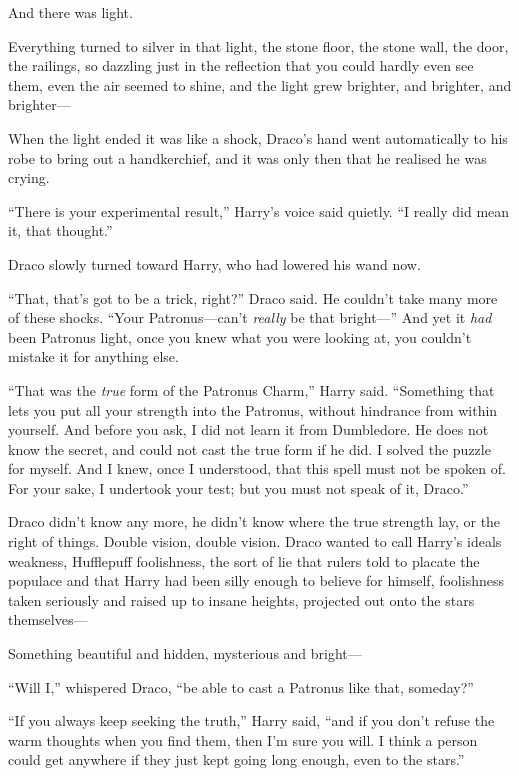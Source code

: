 And there was light.

Everything turned to silver in that light, the stone floor, the stone
wall, the door, the railings, so dazzling just in the reflection that
you could hardly even see them, even the air seemed to shine, and the
light grew brighter, and brighter, and brighter---

When the light ended it was like a shock, Draco's hand went
automatically to his robe to bring out a handkerchief, and it was only
then that he realised he was crying.

``There is your experimental result,'' Harry's voice said quietly. ``I
really did mean it, that thought.''

Draco slowly turned toward Harry, who had lowered his wand now.

``That, that's got to be a trick, right?'' Draco said. He couldn't take
many more of these shocks. ``Your Patronus---can't \emph{really} be that
bright---'' And yet it \emph{had} been Patronus light, once you knew
what you were looking at, you couldn't mistake it for anything else.

``That was the \emph{true} form of the Patronus Charm,'' Harry said.
``Something that lets you put all your strength into the Patronus,
without hindrance from within yourself. And before you ask, I did not
learn it from Dumbledore. He does not know the secret, and could not
cast the true form if he did. I solved the puzzle for myself. And I
knew, once I understood, that this spell must not be spoken of. For your
sake, I undertook your test; but you must not speak of it, Draco.''

Draco didn't know any more, he didn't know where the true strength lay,
or the right of things. Double vision, double vision. Draco wanted to
call Harry's ideals weakness, Hufflepuff foolishness, the sort of lie
that rulers told to placate the populace and that Harry had been silly
enough to believe for himself, foolishness taken seriously and raised up
to insane heights, projected out onto the stars themselves---

Something beautiful and hidden, mysterious and bright---

``Will I,'' whispered Draco, ``be able to cast a Patronus like that,
someday?''

``If you always keep seeking the truth,'' Harry said, ``and if you don't
refuse the warm thoughts when you find them, then I'm sure you will. I
think a person could get anywhere if they just kept going long enough,
even to the stars.''

